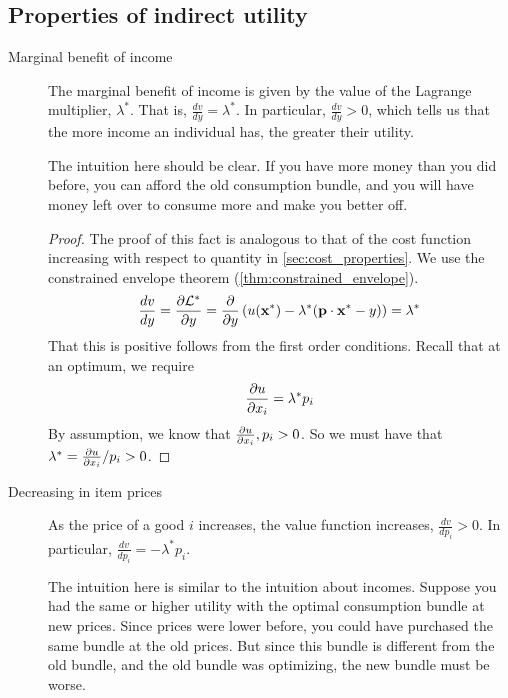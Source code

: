 \subsection*{Properties of indirect utility}
\begin{description}
    \item[Marginal benefit of income] The marginal benefit of income is given by the value of the Lagrange multiplier, $\lambda^*$. That is, $\frac{dv}{dy} = \lambda^*$. In particular, $\frac{dv}{dy} > 0$, which tells us that the more income an individual has, the greater their utility.
    
    The intuition here should be clear. If you have more money than you did before, you can afford the old consumption bundle, and you will have money left over to consume more and make you better off.

    \begin{proof}
        The proof of this fact is analogous to that of the cost function increasing with respect to quantity in \ref{sec:cost_properties}. We use the constrained envelope theorem (\ref{thm:constrained_envelope}).
        \begin{align*}
            \frac{dv}{dy} = \frac{\partial\mathcal{L}^*}{\partial y} = \frac{\partial }{\partial y} \left(u(\mathbf{x}^*) - \lambda^* (\mathbf{p} \cdot \mathbf{x}^* - y)\right) = \lambda^*
        \end{align*}
        That this is positive follows from the first order conditions. Recall that at an optimum, we require 
        \begin{align*}
            \frac{\partial u}{\partial x_i} = \lambda^* p_i
        \end{align*}
        By assumption, we know that $\frac{\partial u}{\partial x_i}, p_i > 0$. So we must have that $\lambda^* = \frac{\partial u}{\partial x_i} / p_i > 0$.
    \end{proof}

    \item[Decreasing in item prices] As the price of a good $i$ increases, the value function increases, $\frac{dv}{dp_i} > 0$. In particular, $\frac{dv}{dp_i} = - \lambda^* p_i$. 
    
    The intuition here is similar to the intuition about incomes. Suppose you had the same or higher utility with the optimal consumption bundle at new prices. Since prices were lower before, you could have purchased the same bundle at the old prices. But since this bundle is different from the old bundle, and the old bundle was optimizing, the new bundle must be worse.


\end{description}
